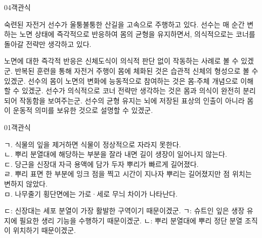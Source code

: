 \documentclass[fs85,seriesWit]{korfarm-base}
\begin{document}
\begin{kfQBlock}{04}{객관식}
\begin{kfEvidence}숙련된 자전거 선수가 울퉁불퉁한 산길을 고속으로 주행하고 있다. 선수는 매 순간 변하는 노면 상태에 즉각적으로 반응하여 몸의 균형을 유지하면서, 의식적으로는 코너를 돌아갈 전략만 생각하고 있다.\end{kfEvidence}
\begin{kfChoices}
\kfChoice 노면에 대한 즉각적 반응은 신체도식이 의식적 판단 없이 작동하는 사례로 볼 수 있겠군.
\kfChoice 반복된 훈련을 통해 자전거 주행이 몸에 체화된 것은 습관적 신체의 형성으로 볼 수 있겠군.
\kfChoice 선수의 몸이 노면의 변화에 능동적으로 참여하는 것은 몸-주체 개념으로 이해할 수 있겠군.
\kfChoice 선수가 의식적으로 코너 전략만 생각하는 것은 몸과 의식이 완전히 분리되어 작동함을 보여주는군.
\kfChoice 선수의 균형 유지는 뇌에 저장된 표상의 인출이 아니라 몸이 운동적 의미를 보유한 것으로 설명할 수 있겠군.
\end{kfChoices}
\end{kfQBlock}

\kfEndMC



\begin{kfQBlock}{01}{객관식}
\begin{kfEvidence}ㄱ. 식물의 잎을 제거하면 식물이 정상적으로 자라지 못한다. \\\relax
ㄴ. 뿌리 분열대에 해당하는 부분을 잘라 내면 길이 생장이 일어나지 않는다. \\\relax
ㄷ. 당근을 신장대 자극 용액에 담가 두자 뿌리가 빠르게 길어졌다. \\\relax
ㄹ. 뿌리 표면 한 부분에 잉크 점을 찍고 시간이 지나자 뿌리는 길어졌지만 점 위치는 변하지 않았다. \\\relax
ㅁ. 나무줄기 횡단면에는 가로·세로 무늬 차이가 나타난다.\end{kfEvidence}
\begin{kfChoices}
\kfChoice ㄷ: 신장대는 세포 분열이 가장 활발한 구역이기 때문이겠군.
\kfChoice ㄱ: 슈트인 잎은 생장 유지에 필요한 생리 기능을 수행하기 때문이겠군.
\kfChoice ㄴ: 뿌리 분열대에 뿌리 정단 분열 조직이 위치하기 때문이겠군.
\end{kfChoices}
\end{kfQBlock}
\end{document}
